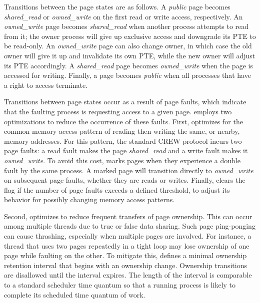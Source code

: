 
Transitions between the page states are as follows. A {\em public} page
becomes {\em shared\_read} or {\em owned\_write} on the first read or
write access, respectively. An {\em owned\_write} page becomes {\em
shared\_read} when another process attempts to read from it; the owner
process will give up exclusive access and downgrade its PTE to be
read-only. An {\em owned\_write} page can also change owner, in which
case the old owner will give it up and invalidate its own PTE, while
the new owner will adjust its PTE accordingly. A {\em shared\_read}
page becomes {\em owned\_write} when the page is accessed for writing.
Finally, a page becomes {\em public} when all processes that have a
right to access terminate.  

Transitions between page states occur as a result of page faults,
which indicate that the faulting process is requesting access to a
given page.  \scribe{} employs two optimizations to reduce the
occurrence of these faults.  First, \scribe{} optimizes for the
common memory access pattern of reading then writing the same, or
nearby, memory addresses.  For this pattern, the standard CREW protocol
incurs two page faults: a read fault makes the page {\em shared\_read}
and a write fault makes it {\em owned\_write}. To avoid this cost,
\scribe{} marks pages when they experience a double fault by the same
process. A marked page will transition directly to {\em owned\_write}
on subsequent page faults, whether they are reads or writes. Finally,
\scribe{} clears the flag if the number of page faults exceeds a defined
threshold, to adjust its behavior for possibly changing memory access
patterns.  

Second, \scribe{} optimizes to reduce frequent transfers of page
ownership.  This can occur among multiple threads due to true or
false data sharing.  Such page ping-ponging can cause 
thrashing, especially when multiple pages are involved.  For instance,
a thread that uses two pages repeatedly in a tight loop may
lose ownership of one page while faulting on the other. To
mitigate this, \scribe{} defines a minimal ownership retention
interval that begins with an ownership change.  Ownership transitions
are disallowed until the interval expires.
The length
of the interval is comparable to a standard scheduler time quantum so
that a running process is likely to
complete its scheduled
time quantum of work.

  

